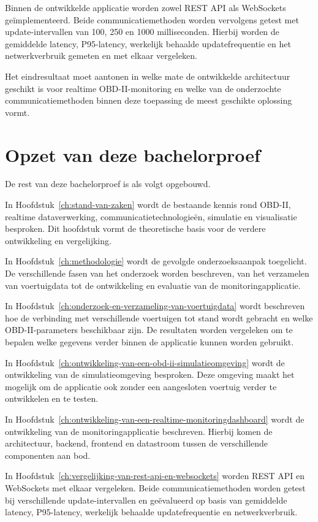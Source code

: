 Binnen de ontwikkelde applicatie worden zowel REST API als WebSockets
geïmplementeerd. Beide communicatiemethoden worden vervolgens getest met
update-intervallen van 100, 250 en 1000 milliseconden. Hierbij worden de
gemiddelde latency, P95-latency, werkelijk behaalde updatefrequentie en het
netwerkverbruik gemeten en met elkaar vergeleken.

Het eindresultaat moet aantonen in welke mate de ontwikkelde architectuur
geschikt is voor realtime OBD-II-monitoring en welke van de onderzochte
communicatiemethoden binnen deze toepassing de meest geschikte oplossing vormt.


\section{Opzet van deze bachelorproef}

De rest van deze bachelorproef is als volgt opgebouwd.

In Hoofdstuk~\ref{ch:stand-van-zaken} wordt de bestaande kennis rond OBD-II,
realtime dataverwerking, communicatietechnologieën, simulatie en visualisatie
besproken. Dit hoofdstuk vormt de theoretische basis voor de verdere
ontwikkeling en vergelijking.

In Hoofdstuk~\ref{ch:methodologie} wordt de gevolgde onderzoeksaanpak
toegelicht. De verschillende fasen van het onderzoek worden beschreven, van
het verzamelen van voertuigdata tot de ontwikkeling en evaluatie van de
monitoringapplicatie.

In Hoofdstuk~\ref{ch:onderzoek-en-verzameling-van-voertuigdata} wordt
beschreven hoe de verbinding met verschillende voertuigen tot stand wordt
gebracht en welke OBD-II-parameters beschikbaar zijn. De resultaten worden
vergeleken om te bepalen welke gegevens verder binnen de applicatie kunnen
worden gebruikt.

In Hoofdstuk~\ref{ch:ontwikkeling-van-een-obd-ii-simulatieomgeving} wordt de
ontwikkeling van de simulatieomgeving besproken. Deze omgeving maakt het
mogelijk om de applicatie ook zonder een aangesloten voertuig verder te
ontwikkelen en te testen.

In Hoofdstuk~\ref{ch:ontwikkeling-van-een-realtime-monitoringdashboard} wordt
de ontwikkeling van de monitoringapplicatie beschreven. Hierbij komen de
architectuur, backend, frontend en datastroom tussen de verschillende
componenten aan bod.

In Hoofdstuk~\ref{ch:vergelijking-van-rest-api-en-websockets} worden REST API
en WebSockets met elkaar vergeleken. Beide communicatiemethoden worden getest
bij verschillende update-intervallen en geëvalueerd op basis van gemiddelde
latency, P95-latency, werkelijk behaalde updatefrequentie en netwerkverbruik.

